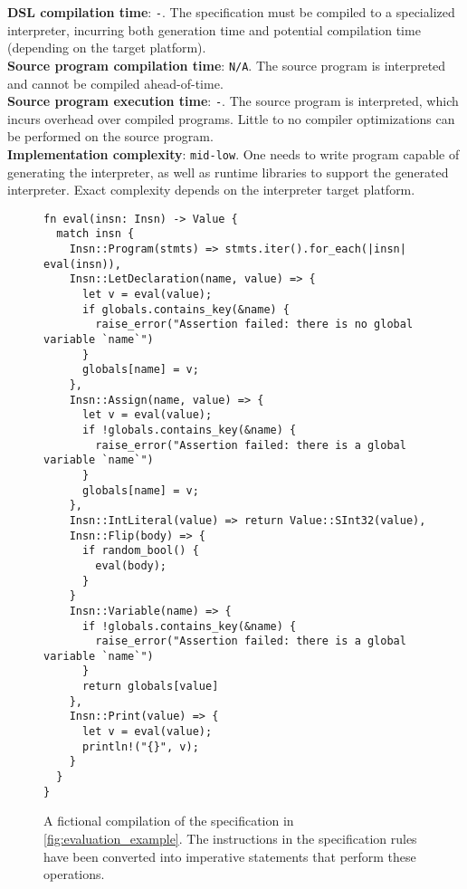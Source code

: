 \noindent
\textbf{\ac{DSL} compilation time}: \texttt{-}. The specification must be compiled to a specialized interpreter, incurring both generation time and potential compilation time (depending on the target platform).\\
\textbf{Source program compilation time}: \texttt{N/A}. The source program is interpreted and cannot be compiled ahead-of-time.\\
\textbf{Source program execution time}: \texttt{-}. The source program is interpreted, which incurs overhead over compiled programs. Little to no compiler optimizations can be performed on the source program. \\
\textbf{Implementation complexity}: \texttt{mid-low}. One needs to write program capable of generating the interpreter, as well as runtime libraries to support the generated interpreter. Exact complexity depends on the interpreter target platform.

\begin{figure}
  \begin{verbatim}
fn eval(insn: Insn) -> Value {
  match insn {
    Insn::Program(stmts) => stmts.iter().for_each(|insn| eval(insn)),
    Insn::LetDeclaration(name, value) => {
      let v = eval(value);
      if globals.contains_key(&name) {
        raise_error("Assertion failed: there is no global variable `name`")
      }
      globals[name] = v;
    },
    Insn::Assign(name, value) => {
      let v = eval(value);
      if !globals.contains_key(&name) {
        raise_error("Assertion failed: there is a global variable `name`")
      }
      globals[name] = v;
    },
    Insn::IntLiteral(value) => return Value::SInt32(value),
    Insn::Flip(body) => {
      if random_bool() {
        eval(body);
      }
    }
    Insn::Variable(name) => {
      if !globals.contains_key(&name) {
        raise_error("Assertion failed: there is a global variable `name`")
      }
      return globals[value]
    },
    Insn::Print(value) => {
      let v = eval(value);
      println!("{}", v);
    }
  }
}
  \end{verbatim}
  \caption{A fictional compilation of the specification in \cref{fig:evaluation_example}. The instructions in the specification rules have been converted into imperative statements that perform these operations.}
  \label{fig:evaluation_example_compiled_interpreter}
\end{figure}


